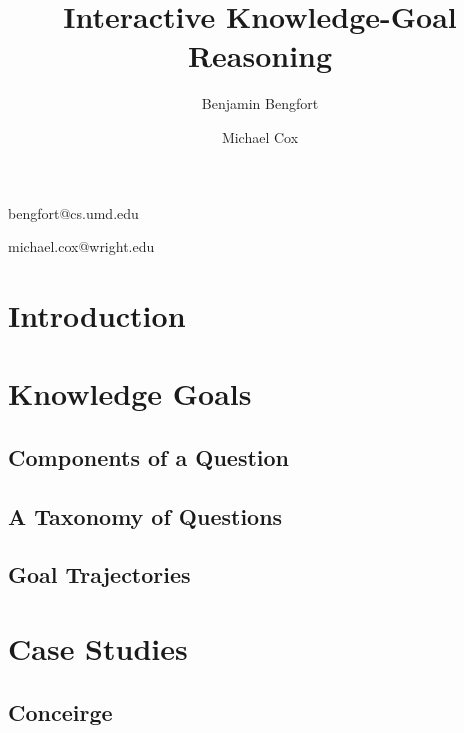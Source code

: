 \documentclass[11pt,letterpaper]{article}
\begin{document}
\title{Interactive Knowledge-Goal Reasoning}

\author{Benjamin Bengfort}{bengfort@cs.umd.edu}
\address{Department of Computer Science, University of Maryland,
         College Park, MD 20742 USA}
\author{Michael Cox}{michael.cox@wright.edu}
\address{Wright State Research Institute,
         Beavercreek, OH 45431 USA}
\vskip 0.2in


\begin{abstract}

\end{abstract}

\section{Introduction}

\section{Knowledge Goals}

\subsection{Components of a Question}

\subsection{A Taxonomy of Questions}

\subsection{Goal Trajectories}

\section{Case Studies}

\subsection{Conceirge}

\subsection{}
\end{document}
